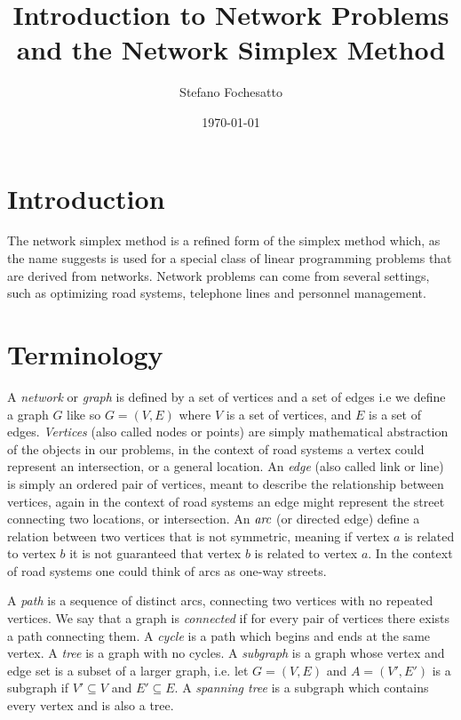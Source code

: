 \documentclass[12pt]{amsart}
\begin{document}
\title{Introduction to Network Problems and the Network Simplex Method}

\author{Stefano Fochesatto}

\date{\today}

\maketitle

\section{Introduction}
The network simplex method is a refined form of the simplex method which, as the name suggests is used for 
a special class of linear programming problems that are derived from networks. Network problems can come from 
several settings, such as optimizing road systems, telephone lines and personnel management.



\section{Terminology}  
A \emph{network} or \emph{graph} is defined by a set of vertices and a set of edges i.e we define a graph $G$ like so $G = (V, E)$
where $V$ is a set of vertices, and $E$ is a set of edges. \emph{Vertices} (also called nodes or points) 
are simply mathematical abstraction of the objects in our problems, in the context of road systems a vertex could represent 
an intersection, or a general location. An \emph{edge} (also called link or line) is simply an ordered pair of vertices, meant to describe the 
relationship between vertices, again in the context of road systems an edge might represent the street connecting two locations, or intersection.
An $\emph{arc}$ (or directed edge) define a relation between two vertices that is not symmetric, meaning if vertex $a$ is related to vertex $b$
it is not guaranteed that vertex $b$ is related to vertex $a$. In the context of road systems one could think of arcs as one-way streets.


A \emph{path} is a sequence of distinct arcs, connecting two vertices with no repeated vertices. We say that a graph is \emph{connected} if 
for every pair of vertices there exists a path connecting them. A \emph{cycle} is a path which begins and ends at the same vertex. A \emph{tree}
is a graph with no cycles. A \emph{subgraph} is a graph whose vertex and edge set is a subset of a larger graph, i.e. let $G = (V, E)$
and $A = (V', E')$ is a subgraph if $V'\subseteq V$ and $E'\subseteq E$. A \emph{spanning tree} is a subgraph which contains every vertex and is also a tree.  
\end{document}
